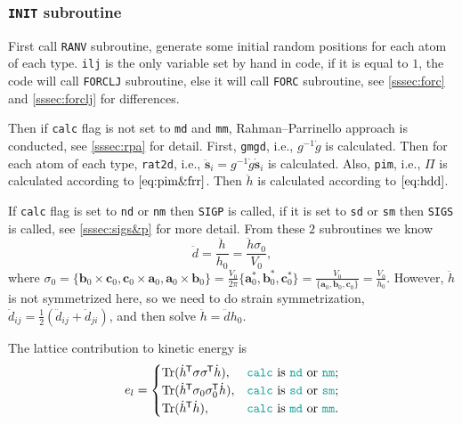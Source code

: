 
\subsubsection{\texttt{INIT} subroutine}
\label{sssec:init}

First call \texttt{RANV} subroutine,
generate some initial random positions for each atom of each type.
\texttt{ilj} is the only variable set by hand in code, if it is equal to $1$,
the code will call \texttt{FORCLJ} subroutine, else it will call \texttt{FORC}
subroutine, see \ref{sssec:forc} and \ref{sssec:forclj} for differences.

Then if \texttt{calc} flag is not set to \texttt{md} and \texttt{mm},
Rahman--Parrinello approach is conducted, see \ref{sssec:rpa} for detail.
First, \texttt{gmgd}, i.e., $g^{-1} \dot{g}$ is calculated.
Then for each atom of each type,
\texttt{rat2d}, i.e., $\ddot{\bm{s}}_i = g^{-1} \dot{g} \dot{ \bm{s} }_i$ is calculated.
Also, \texttt{pim}, i.e., $\Pi$ is calculated according to $\eqref{eq:pim&frr}$.
Then $\ddot{h}$ is calculated according to $\eqref{eq:hdd}$.

If \texttt{calc} flag is set to \texttt{nd} or \texttt{nm}
then \texttt{SIGP} is called, if it is set to \texttt{sd} or
\texttt{sm} then \texttt{SIGS} is called, see \ref{sssec:sigs&p}
for more detail.
From these $2$ subroutines we know
\begin{equation}
	\ddot{d} = \frac{ \ddot{h} }{ h_0 } = \frac{ \ddot{h} \sigma_0}{V_0},
\end{equation}
where
$\sigma_0 =
\{
\bm{b}_0 \times \bm{c}_0, \bm{c}_0 \times \bm{a}_0,
\bm{a}_0 \times \bm{b}_0
\}
= \frac{ V_0 }{ 2\pi } \{
\bm{a}^\ast_0, \bm{b}^\ast_0, \bm{c}^\ast_0
\} = \frac{ V_0 }{ \{\bm{a}_0, \bm{b}_0, \bm{c}_0 \} } = \frac{ V_0 }{ h_0 }$.
However, $\ddot{h}$ is not symmetrized here, so we need to do
strain symmetrization, $\ddot{d}_{ij} = \frac{ 1 }{ 2 }
(\ddot{d}_{ij} + \ddot{d}_{ji})$, and then solve
$\ddot{h} = \ddot{d} h_0$.

The lattice contribution to kinetic energy is
\begin{equation}\label{eq:calc}
	e_l =
	\begin{cases}
		\Tr (\dot{h}\tran \sigma \sigma\tran \dot{h}),      & \text{\texttt{calc} is \texttt{nd} or \texttt{nm};} \\
		\Tr(\dot{h}\tran \sigma_0 \sigma_0\tran \dot{ h }), & \text{\texttt{calc} is \texttt{sd} or \texttt{sm};} \\
		\Tr(\dot{h}\tran \dot{ h }),                        & \text{\texttt{calc} is \texttt{md} or \texttt{mm}.}
	\end{cases}
\end{equation}

